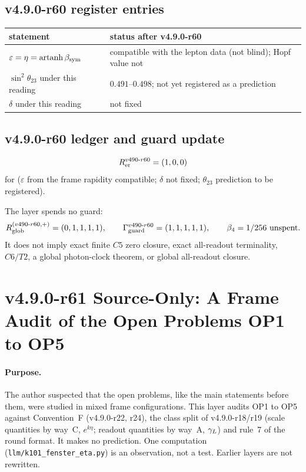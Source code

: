 \subsection*{v4.9.0-r60 register entries}
\label{subsec:v490-r60-register}

\begin{center}
\small
\begin{tabular}{@{}>{\raggedright\arraybackslash}p{}>{\raggedright\arraybackslash}p{}@{}}
\toprule
statement & status after v4.9.0-r60\\
\midrule
\(\varepsilon=\eta=\operatorname{artanh}\beta_{\rm sym}\) & compatible with the lepton data (not blind); Hopf value not\\
\(\sin^2\theta_{23}\) under this reading & \(0.491\)--\(0.498\); not yet registered as a prediction\\
\(\delta\) under this reading & not fixed\\
\bottomrule
\end{tabular}
\end{center}

\subsection*{v4.9.0-r60 ledger and guard update}
\label{subsec:v490-r60-ledger-guard}

\[
R_{\rm er}^{v490\text{-}r60}=(1,0,0)
\]
for (\(\varepsilon\) from the frame rapidity compatible; \(\delta\) not fixed; \(\theta_{23}\) prediction to be registered).

The layer spends no guard:
\[
R_{\rm glob}^{(v490\text{-}r60,+)}=(0,1,1,1,1),
\qquad
\Gamma_{\rm guard}^{v490\text{-}r60}=(1,1,1,1,1),
\qquad
\beta_4=1/256\ \text{unspent}.
\]
It does not imply exact finite \(C5\) zero closure, exact all-readout terminality,
\(C6/T2\), a global photon-clock theorem, or global all-readout closure.

\clearpage
\section*{v4.9.0-r61 Source-Only: A Frame Audit of the Open Problems OP1 to OP5}
\label{sec:v490-r61-op-frame-audit}

\paragraph{Purpose.}
The author suspected that the open problems, like the main statements before them, were studied in mixed frame configurations.  This layer audits OP1 to OP5 against
Convention~F (v4.9.0-r22, r24), the class split of v4.9.0-r18/r19 (scale quantities by way~C, \(e^{k\eta}\); readout quantities by way~A, \(\gamma_L\)) and rule~7 of the round
format.  It makes no prediction.  One computation (\texttt{llm/k101\_fenster\_eta.py}) is an observation, not a test.  Earlier layers are not rewritten.

